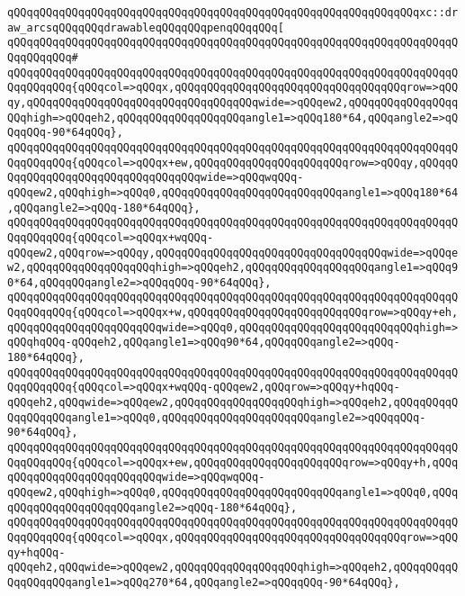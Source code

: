 \newline
\verb|qQQqqQQqqQQqqQQqqQQqqQQqqQQqqQQqqQQqqQQqqQQqqQQqqQQqqQQqqQQqqQQqxc::draw_arcsqQQqqQQqdrawableqQQqqQQqpenqQQqqQQq[|\newline
\verb|qQQqqQQqqQQqqQQqqQQqqQQqqQQqqQQqqQQqqQQqqQQqqQQqqQQqqQQqqQQqqQQqqQQqqQQqqQQqqQQq#|\newline
\verb|qQQqqQQqqQQqqQQqqQQqqQQqqQQqqQQqqQQqqQQqqQQqqQQqqQQqqQQqqQQqqQQqqQQqqQQqqQQqqQQq{qQQqcol=>qQQqx,qQQqqQQqqQQqqQQqqQQqqQQqqQQqqQQqqQQqrow=>qQQqy,qQQqqQQqqQQqqQQqqQQqqQQqqQQqqQQqqQQqwide=>qQQqew2,qQQqqQQqqQQqqQQqqQQqhigh=>qQQqeh2,qQQqqQQqqQQqqQQqqQQqangle1=>qQQq180*64,qQQqangle2=>qQQqqQQq-90*64qQQq},|\newline
\verb|qQQqqQQqqQQqqQQqqQQqqQQqqQQqqQQqqQQqqQQqqQQqqQQqqQQqqQQqqQQqqQQqqQQqqQQqqQQqqQQq{qQQqcol=>qQQqx+ew,qQQqqQQqqQQqqQQqqQQqqQQqrow=>qQQqy,qQQqqQQqqQQqqQQqqQQqqQQqqQQqqQQqqQQqwide=>qQQqwqQQq-qQQqew2,qQQqhigh=>qQQq0,qQQqqQQqqQQqqQQqqQQqqQQqqQQqangle1=>qQQq180*64,qQQqangle2=>qQQq-180*64qQQq},|\newline
\verb|qQQqqQQqqQQqqQQqqQQqqQQqqQQqqQQqqQQqqQQqqQQqqQQqqQQqqQQqqQQqqQQqqQQqqQQqqQQqqQQq{qQQqcol=>qQQqx+wqQQq-qQQqew2,qQQqrow=>qQQqy,qQQqqQQqqQQqqQQqqQQqqQQqqQQqqQQqqQQqwide=>qQQqew2,qQQqqQQqqQQqqQQqqQQqhigh=>qQQqeh2,qQQqqQQqqQQqqQQqqQQqangle1=>qQQq90*64,qQQqqQQqangle2=>qQQqqQQq-90*64qQQq},|\newline
\verb|qQQqqQQqqQQqqQQqqQQqqQQqqQQqqQQqqQQqqQQqqQQqqQQqqQQqqQQqqQQqqQQqqQQqqQQqqQQqqQQq{qQQqcol=>qQQqx+w,qQQqqQQqqQQqqQQqqQQqqQQqqQQqrow=>qQQqy+eh,qQQqqQQqqQQqqQQqqQQqqQQqwide=>qQQq0,qQQqqQQqqQQqqQQqqQQqqQQqqQQqhigh=>qQQqhqQQq-qQQqeh2,qQQqangle1=>qQQq90*64,qQQqqQQqangle2=>qQQq-180*64qQQq},|\newline
\verb|qQQqqQQqqQQqqQQqqQQqqQQqqQQqqQQqqQQqqQQqqQQqqQQqqQQqqQQqqQQqqQQqqQQqqQQqqQQqqQQq{qQQqcol=>qQQqx+wqQQq-qQQqew2,qQQqrow=>qQQqy+hqQQq-qQQqeh2,qQQqwide=>qQQqew2,qQQqqQQqqQQqqQQqqQQqhigh=>qQQqeh2,qQQqqQQqqQQqqQQqqQQqangle1=>qQQq0,qQQqqQQqqQQqqQQqqQQqqQQqangle2=>qQQqqQQq-90*64qQQq},|\newline
\verb|qQQqqQQqqQQqqQQqqQQqqQQqqQQqqQQqqQQqqQQqqQQqqQQqqQQqqQQqqQQqqQQqqQQqqQQqqQQqqQQq{qQQqcol=>qQQqx+ew,qQQqqQQqqQQqqQQqqQQqqQQqrow=>qQQqy+h,qQQqqQQqqQQqqQQqqQQqqQQqqQQqwide=>qQQqwqQQq-qQQqew2,qQQqhigh=>qQQq0,qQQqqQQqqQQqqQQqqQQqqQQqqQQqangle1=>qQQq0,qQQqqQQqqQQqqQQqqQQqqQQqangle2=>qQQq-180*64qQQq},|\newline
\verb|qQQqqQQqqQQqqQQqqQQqqQQqqQQqqQQqqQQqqQQqqQQqqQQqqQQqqQQqqQQqqQQqqQQqqQQqqQQqqQQq{qQQqcol=>qQQqx,qQQqqQQqqQQqqQQqqQQqqQQqqQQqqQQqqQQqrow=>qQQqy+hqQQq-qQQqeh2,qQQqwide=>qQQqew2,qQQqqQQqqQQqqQQqqQQqhigh=>qQQqeh2,qQQqqQQqqQQqqQQqqQQqangle1=>qQQq270*64,qQQqangle2=>qQQqqQQq-90*64qQQq},|\newline
